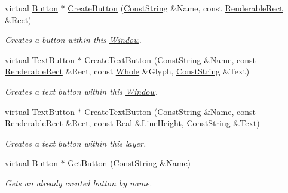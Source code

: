 \begin{DoxyCompactItemize}
virtual \hyperlink{classphys_1_1UI_1_1Button}{Button} $\ast$ \hyperlink{classphys_1_1UI_1_1Window_add2be540cd01477a93d0e6362bc4de1f}{CreateButton} (\hyperlink{namespacephys_a5ce5049f8b4bf88d6413c47b504ebb31}{ConstString} \&Name, const \hyperlink{structphys_1_1UI_1_1RenderableRect}{RenderableRect} \&Rect)
\begin{DoxyCompactList}\small\item\em Creates a button within this \hyperlink{classphys_1_1UI_1_1Window}{Window}. \item\end{DoxyCompactList}\item 
virtual \hyperlink{classphys_1_1UI_1_1TextButton}{TextButton} $\ast$ \hyperlink{classphys_1_1UI_1_1Window_abcc01b8fb17ba93c87a46b746350913e}{CreateTextButton} (\hyperlink{namespacephys_a5ce5049f8b4bf88d6413c47b504ebb31}{ConstString} \&Name, const \hyperlink{structphys_1_1UI_1_1RenderableRect}{RenderableRect} \&Rect, const \hyperlink{namespacephys_a460f6bc24c8dd347b05e0366ae34f34a}{Whole} \&Glyph, \hyperlink{namespacephys_a5ce5049f8b4bf88d6413c47b504ebb31}{ConstString} \&Text)
\begin{DoxyCompactList}\small\item\em Creates a text button within this \hyperlink{classphys_1_1UI_1_1Window}{Window}. \item\end{DoxyCompactList}\item 
virtual \hyperlink{classphys_1_1UI_1_1TextButton}{TextButton} $\ast$ \hyperlink{classphys_1_1UI_1_1Window_aafdd954c57021628d8f96a56e0b06346}{CreateTextButton} (\hyperlink{namespacephys_a5ce5049f8b4bf88d6413c47b504ebb31}{ConstString} \&Name, const \hyperlink{structphys_1_1UI_1_1RenderableRect}{RenderableRect} \&Rect, const \hyperlink{namespacephys_af7eb897198d265b8e868f45240230d5f}{Real} \&LineHeight, \hyperlink{namespacephys_a5ce5049f8b4bf88d6413c47b504ebb31}{ConstString} \&Text)
\begin{DoxyCompactList}\small\item\em Creates a text button within this layer. \item\end{DoxyCompactList}\item 
virtual \hyperlink{classphys_1_1UI_1_1Button}{Button} $\ast$ \hyperlink{classphys_1_1UI_1_1Window_ab1152992cf6b636c8a4911889d930d9a}{GetButton} (\hyperlink{namespacephys_a5ce5049f8b4bf88d6413c47b504ebb31}{ConstString} \&Name)
\begin{DoxyCompactList}\small\item\em Gets an already created button by name. \item\end{DoxyCompactList}\item 

\end{DoxyCompactItemize}
